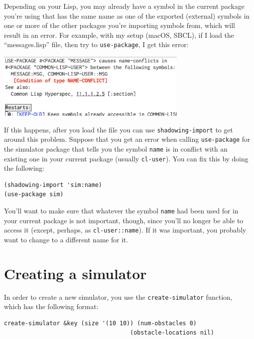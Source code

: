 \documentclass[11pt]{tufte-handout}
\begin{document}
Depending on your Lisp, you may already have a symbol in the current package you're using that has the same name as one of the exported (external) symbols in one or more of the other packages you're
importing symbols from, which will result in an error.  For example, with my setup (macOS, SBCL), if I load the ``messages.lisp'' file, then try to \texttt{use-package}, I get this error:

\begin{center}
\begin{center}
\includegraphics[width=0.7\textwidth]{./Figs/package-error.png}
\end{center}
\end{center}

If this happens, after you load the file you can use \texttt{shadowing-import} to get around this problem.  Suppose that you get an error when calling \texttt{use-package} for the simulator package that tells you the symbol \texttt{name} is in conflict with an existing one in your current package (usually \texttt{cl-user}).  You can fix this by doing the following:
\begin{verbatim}
(shadowing-import 'sim:name)
(use-package sim)
\end{verbatim}


You'll want to make sure that whatever the symbol \texttt{name} had been used for in your current package is not important, though, since you'll no longer be able to access it (except, perhaps, as \texttt{cl-user::name}).  If it was important, you probably want to change to a different name for it.

\section{Creating a simulator}
\label{sec:org0e10dd8}

In order to create a new simulator, you use the \texttt{create-simulator} function, which has the following format:
\begin{verbatim}
create-simulator &key (size '(10 10)) (num-obstacles 0) 
                                    (obstacle-locations nil)
\end{verbatim}
\end{document}
